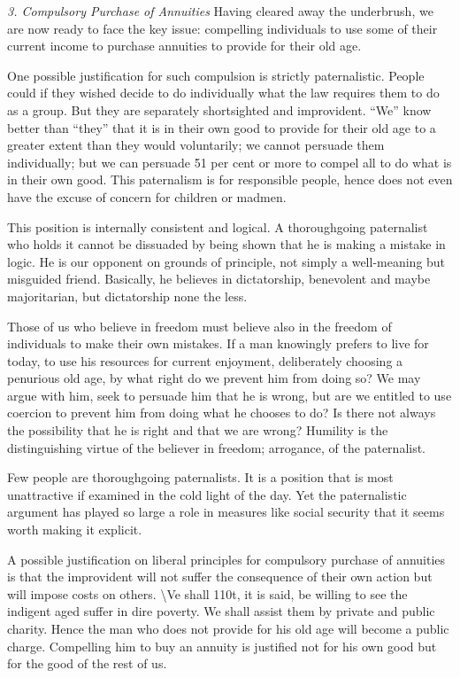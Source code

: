 \documentclass[11pt,openany]{book}
\begin{document}
\emph{3. Compulsory Purchase of Annuities} Having cleared away the underbrush, we are now ready to face the key issue: compelling individuals to use some of their current income to purchase annuities to provide for their old age.

One possible justification for such compulsion is strictly paternalistic. People could if they wished decide to do individually what the law requires them to do as a group. But they are separately shortsighted and improvident. ``We'' know better than ``they'' that it is in their own good to provide for their old age to a greater extent than they would voluntarily; we cannot persuade them individually; but we can persuade 51 per cent or more to compel all to do what is in their own good. This paternalism is for responsible people, hence does not even have the excuse of concern for children or madmen.

This position is internally consistent and logical. A thoroughgoing paternalist who holds it cannot be dissuaded by being shown that he is making a mistake in logic. He is our opponent on grounds of principle, not simply a well-meaning but misguided friend. Basically, he believes in dictatorship, benevolent and maybe majoritarian, but dictatorship none the less.

Those of us who believe in freedom must believe also in the freedom of individuals to make their own mistakes. If a man knowingly prefers to live for today, to use his resources for current enjoyment, deliberately choosing a penurious old age, by what right do we prevent him from doing so? We may argue with him, seek to persuade him that he is wrong, but are we entitled to use coercion to prevent him from doing what he chooses to do? Is there not always the possibility that he is right and that we are wrong? Humility is the distinguishing virtue of the believer in freedom; arrogance, of the paternalist.

Few people are thoroughgoing paternalists. It is a position that is most unattractive if examined in the cold light of the day. Yet the paternalistic argument has played so large a role in measures like social security that it seems worth making it explicit.

A possible justification on liberal principles for compulsory purchase of annuities is that the improvident will not suffer the consequence of their own action but will impose costs on others. \textbackslash{}Ve shall 110t, it is said, be willing to see the indigent aged suffer in dire poverty. We shall assist them by private and public charity. Hence the man who does not provide for his old age will become a public charge. Compelling him to buy an annuity is justified not for his own good but for the good of the rest of us.
\end{document}
